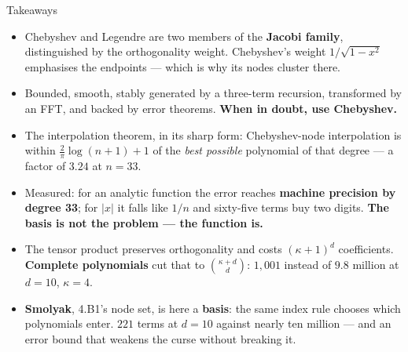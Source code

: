 \begin{frame}{Takeaways}
\begin{takeawaybox}
\begin{itemize}\small
  \item Chebyshev and Legendre are two members of the \textbf{Jacobi family}, distinguished by the orthogonality weight. Chebyshev's weight $1/\sqrt{1-x^{2}}$ emphasises the endpoints --- which is why its nodes cluster there.
  \item Bounded, smooth, stably generated by a three-term recursion, transformed by an FFT, and backed by error theorems. \textbf{When in doubt, use Chebyshev.}
  \item The interpolation theorem, in its sharp form: Chebyshev-node interpolation is within $\tfrac{2}{\pi}\log(n+1)+1$ of the \emph{best possible} polynomial of that degree --- a factor of $\mathbf{3.24}$ at $n=33$.
  \item Measured: for an analytic function the error reaches \textbf{machine precision by degree 33}; for $|x|$ it falls like $1/n$ and sixty-five terms buy two digits. \textbf{The basis is not the problem --- the function is.}
  \item The tensor product preserves orthogonality and costs $(\kappa+1)^{d}$ coefficients. \textbf{Complete polynomials} cut that to $\binom{\kappa+d}{d}$: $1{,}001$ instead of $9.8$ million at $d=10$, $\kappa=4$.
  \item \textbf{Smolyak}, 4.B1's node set, is here a \textbf{basis}: the same index rule chooses which polynomials enter. $221$ terms at $d=10$ against nearly ten million --- and an error bound that weakens the curse without breaking it.
\end{itemize}
\end{takeawaybox}
\end{frame}

